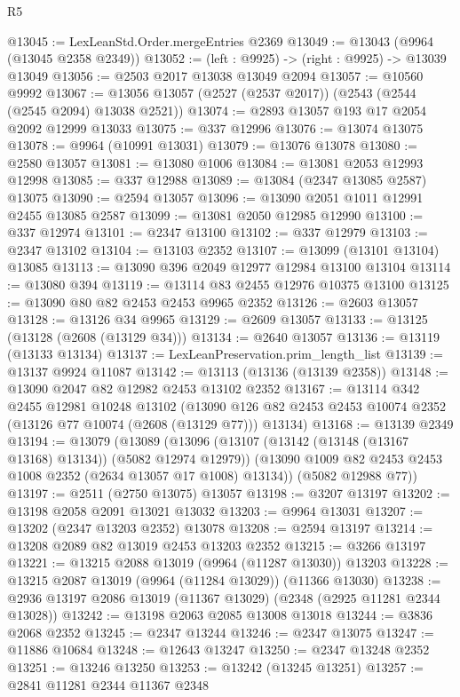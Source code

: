 \begin{lexlean}{R5}
\begin{coremodule}
@13045 := LexLeanStd.Order.mergeEntries @2369
@13049 := @13043 (@9964 (@13045 @2358 @2349))
@13052 := (left : @9925) -> (right : @9925) -> @13039 @13049
@13056 := @2503 @2017 @13038 @13049 @2094
@13057 := @10560 @9992
@13067 := @13056 @13057 (@2527 (@2537 @2017)) (@2543 (@2544 (@2545 @2094) @13038 @2521))
@13074 := @2893 @13057 @193 @17 @2054 @2092 @12999 @13033
@13075 := @337 @12996
@13076 := @13074 @13075
@13078 := @9964 (@10991 @13031)
@13079 := @13076 @13078
@13080 := @2580 @13057
@13081 := @13080 @1006
@13084 := @13081 @2053 @12993 @12998
@13085 := @337 @12988
@13089 := @13084 (@2347 @13085 @2587) @13075
@13090 := @2594 @13057
@13096 := @13090 @2051 @1011 @12991 @2455 @13085 @2587
@13099 := @13081 @2050 @12985 @12990
@13100 := @337 @12974
@13101 := @2347 @13100
@13102 := @337 @12979
@13103 := @2347 @13102
@13104 := @13103 @2352
@13107 := @13099 (@13101 @13104) @13085
@13113 := @13090 @396 @2049 @12977 @12984 @13100 @13104
@13114 := @13080 @394
@13119 := @13114 @83 @2455 @12976 @10375 @13100
@13125 := @13090 @80 @82 @2453 @2453 @9965 @2352
@13126 := @2603 @13057
@13128 := @13126 @34 @9965
@13129 := @2609 @13057
@13133 := @13125 (@13128 (@2608 (@13129 @34)))
@13134 := @2640 @13057
@13136 := @13119 (@13133 @13134)
@13137 := LexLeanPreservation.prim_length_list
@13139 := @13137 @9924 @11087
@13142 := @13113 (@13136 (@13139 @2358))
@13148 := @13090 @2047 @82 @12982 @2453 @13102 @2352
@13167 := @13114
    @342
    @2455
    @12981
    @10248
    @13102
    (@13090 @126 @82 @2453 @2453 @10074 @2352 (@13126 @77 @10074 (@2608 (@13129 @77))) @13134)
@13168 := @13139 @2349
@13194 := @13079
    (@13089
      (@13096
        (@13107 (@13142 (@13148 (@13167 @13168) @13134)) (@5082 @12974 @12979))
        (@13090 @1009 @82 @2453 @2453 @1008 @2352 (@2634 @13057 @17 @1008) @13134))
      (@5082 @12988 @77))
@13197 := @2511 (@2750 @13075) @13057
@13198 := @3207 @13197
@13202 := @13198 @2058 @2091 @13021 @13032
@13203 := @9964 @13031
@13207 := @13202 (@2347 @13203 @2352) @13078
@13208 := @2594 @13197
@13214 := @13208 @2089 @82 @13019 @2453 @13203 @2352
@13215 := @3266 @13197
@13221 := @13215 @2088 @13019 (@9964 (@11287 @13030)) @13203
@13228 := @13215 @2087 @13019 (@9964 (@11284 @13029)) (@11366 @13030)
@13238 := @2936 @13197 @2086 @13019 (@11367 @13029) (@2348 (@2925 @11281 @2344 @13028))
@13242 := @13198 @2063 @2085 @13008 @13018
@13244 := @3836 @2068 @2352
@13245 := @2347 @13244
@13246 := @2347 @13075
@13247 := @11886 @10684
@13248 := @12643 @13247
@13250 := @2347 @13248 @2352
@13251 := @13246 @13250
@13253 := @13242 (@13245 @13251)
@13257 := @2841 @11281 @2344 @11367 @2348

\end{coremodule}
\end{lexlean}
